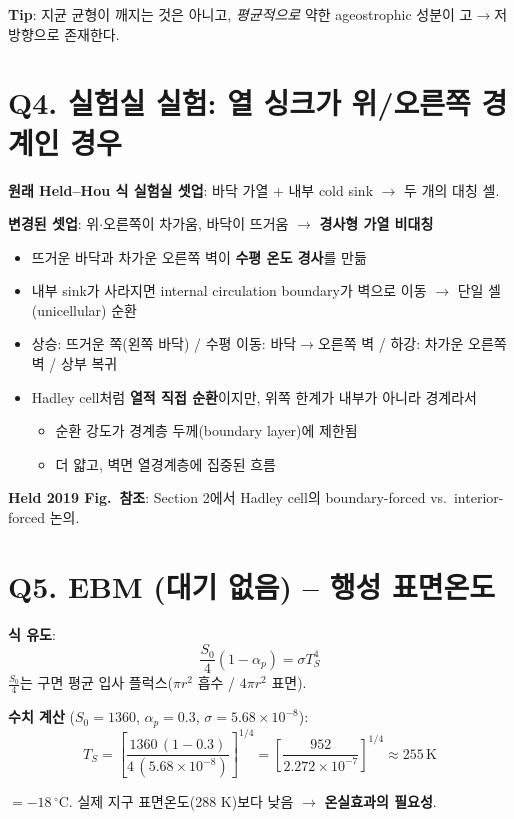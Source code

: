 \documentclass[11pt,a4paper]{article}
\begin{document}
\textbf{Tip}: 지균 균형이 깨지는 것은 아니고, \textit{평균적으로} 약한 ageostrophic 성분이 고$\to$저 방향으로 존재한다.

\section*{Q4. 실험실 실험: 열 싱크가 위/오른쪽 경계인 경우}

\textbf{원래 Held--Hou 식 실험실 셋업}: 바닥 가열 + 내부 cold sink $\to$ 두 개의 대칭 셀.

\textbf{변경된 셋업}: 위$\cdot$오른쪽이 차가움, 바닥이 뜨거움 $\to$ \textbf{경사형 가열 비대칭}
\begin{itemize}
    \item 뜨거운 바닥과 차가운 오른쪽 벽이 \textbf{수평 온도 경사}를 만듦
    \item 내부 sink가 사라지면 internal circulation boundary가 벽으로 이동 $\to$ 단일 셀(unicellular) 순환
    \item 상승: 뜨거운 쪽(왼쪽 바닥) / 수평 이동: 바닥$\to$오른쪽 벽 / 하강: 차가운 오른쪽 벽 / 상부 복귀
    \item Hadley cell처럼 \textbf{열적 직접 순환}이지만, 위쪽 한계가 내부가 아니라 경계라서
    \begin{itemize}
        \item 순환 강도가 경계층 두께(boundary layer)에 제한됨
        \item 더 얇고, 벽면 열경계층에 집중된 흐름
    \end{itemize}
\end{itemize}

\textbf{Held 2019 Fig.\ 참조}: Section 2에서 Hadley cell의 boundary-forced vs.\ interior-forced 논의.

\section*{Q5. EBM (대기 없음) -- 행성 표면온도}

\textbf{식 유도}:
$$\frac{S_0}{4}(1-\alpha_p) = \sigma T_S^4$$
$\tfrac{S_0}{4}$는 구면 평균 입사 플럭스($\pi r^2$ 흡수 / $4\pi r^2$ 표면).

\textbf{수치 계산} ($S_0=1360$, $\alpha_p=0.3$, $\sigma=5.68\times10^{-8}$):
$$T_S = \left[\frac{1360\,(1-0.3)}{4\,(5.68\times 10^{-8})}\right]^{1/4} = \left[\frac{952}{2.272\times 10^{-7}}\right]^{1/4} \approx \boxed{255\,\mathrm{K}}$$

$= -18\,^\circ\mathrm{C}$. 실제 지구 표면온도(288 K)보다 낮음 $\to$ \textbf{온실효과의 필요성}.
\end{document}
